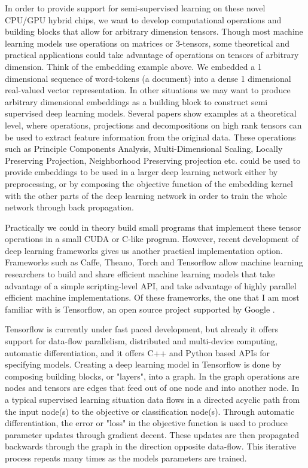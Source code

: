 In order to provide support for semi-supervised learning on these novel CPU/GPU hybrid chips, we want to develop computational operations and building blocks that allow for arbitrary dimension tensors. Though most machine learning models use operations on matrices or 3-tensors, some theoretical and practical applications could take advantage of operations on tensors of arbitrary dimension. Think of the embedding example above. We embedded a 1 dimensional sequence of word-tokens (a document) into a dense 1 dimensional real-valued vector representation. In other situations we may want to produce arbitrary dimensional embeddings as a building block to construct semi supervised deep learning models. Several papers show examples at a theoretical level, where operations, projections and decompositions on high rank tensors can be used to extract feature information from the original data\cite{cichocki2016low, cichocki2014tensor}. These operations such as Principle Components Analysis, Multi-Dimensional Scaling, Locally Preserving Projection, Neighborhood Preserving projection etc. could be used to provide embeddings to be used in a larger deep learning network either by preprocessing, or by composing the objective function of the embedding kernel with the other parts of the deep learning network in order to train the whole network through back propagation.

Practically we could in theory build small programs that implement these tensor operations in a small CUDA or C-like program. However, recent development of deep learning frameworks gives us another practical implementation option. Frameworks such as Caffe, Theano, Torch and Tensorflow allow machine learning researchers to build and share efficient machine learning models that take advantage of a simple scripting-level API, and take advantage of highly parallel efficient machine implementations. Of these frameworks, the one that I am most familiar with is Tensorflow, an open source project supported by Google \cite{abadi2016tensorflow}. 

Tensorflow is currently under fast paced development, but already it offers support for data-flow parallelism, distributed and multi-device computing, automatic differentiation, and it offers C++ and Python based APIs for specifying models. Creating a deep learning model in Tensorflow is done by composing building blocks, or "layers", into a graph. In the graph operations are nodes and tensors are edges that feed out of one node and into another node. In a typical supervised learning situation data flows in a directed acyclic path from the input node(s) to the objective or classification node(s). Through automatic differentiation, the error or "loss" in the objective function is used to produce parameter updates through gradient decent. These updates are then propagated backwards through the graph in the direction opposite data-flow. This iterative process repeats many times as the models parameters are trained.

